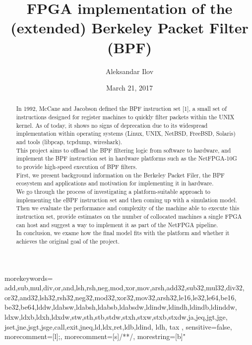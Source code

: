 \documentclass{l4proj}
\begin{document}
{
  morekeywords={
    add,sub,mul,div,or,and,lsh,rsh,neg,mod,xor,mov,arsh,add32,sub32,mul32,div32,
    or32,and32,lsh32,rsh32,neg32,mod32,xor32,mov32,arsh32,le16,le32,le64,be16,
    be32,be64,lddw,ldabsw,ldabsh,ldabsb,ldabsdw,ldindw,ldindh,ldindb,ldinddw,
    ldxw,ldxb,ldxh,ldxdw,stw,sth,stb,stdw,stxh,stxw,stxb,stxdw,ja,jeq,jgt,jge,
    jset,jne,jsgt,jsge,call,exit,jneq,ld,ldx,ret,ldb,ldind, ldh, tax
  },
  sensitive=false, %
  morecomment=[l]{;}, %
  morecomment=[s]{/*}{*/}, %
  morestring=[b]" %
}

\title{FPGA implementation of the (extended) Berkeley Packet Filter (BPF)}
\author{Aleksandar Ilov}
\date{March 21, 2017}
\maketitle

\begin{abstract}
In 1992, McCane and Jacobson defined the BPF instruction set [1], a small set of instructions designed for register machines to quickly filter packets within the UNIX kernel. As of today, it shows no signs of deprecation due to its widespread implementation within operating systems (Linux, UNIX, NetBSD, FreeBSD, Solaris) and tools (libpcap, tcpdump, wireshark).\\
This project aims to offload the BPF filtering logic from software to hardware, and implement the BPF instruction set in hardware platforms such as the NetFPGA-10G to provide high-speed execution of BPF filters.\\
First, we present background information on the Berkeley Packet Filer, the BPF ecosystem and applications and motivation for implementing it in hardware.\\
We go through the process of investigating a platform-suitable approach to implementing the eBPF instruction set and then coming up with a simulation model.\\
Then we evaluate the performance and complexity of the machine able to execute this instruction set, provide estimates on the number of collocated machines a single FPGA can host and suggest a way to implement it as part of the NetFPGA pipeline.\\
In conclusion, we exame how the final model fits with the platform and whether it achieves the original goal of the project.
\end{abstract}
\end{document}
